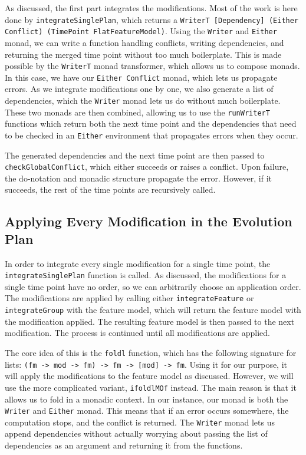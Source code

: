 \documentclass[a4paper,english]{ifimaster}
\begin{document}
As discussed, the first part integrates the modifications. Most of the work is here done by \texttt{integrate\-Single\-Plan}, which returns a \texttt{WriterT [Dependency] (Either Conflict) (TimePoint FlatFeatureModel)}. Using the \texttt{Writer} and \texttt{Either} monad, we can write a function handling conflicts, writing dependencies, and returning the merged time point without too much boilerplate. This is made possible by the \texttt{WriterT} monad transformer, which allows us to compose monads. In this case, we have our \texttt{Either Conflict} monad, which lets us propagate errors. As we integrate modifications one by one, we also generate a list of dependencies, which the \texttt{Writer} monad lets us do without much boilerplate. These two monads are then combined, allowing us to use the \texttt{runWriterT} functions which return both the next time point and the dependencies that need to be checked in an \texttt{Either} environment that propagates errors when they occur.

The generated dependencies and the next time point are then passed to \texttt{check\-Global\-Conflict}, which either succeeds or raises a conflict. Upon failure, the do-notation and monadic structure propagate the error. However, if it succeeds, the rest of the time points are recursively called.

\subsection{Applying Every Modification in the Evolution Plan}%
\label{sub:applying_modifications}

In order to integrate every single modification for a single time point, the \texttt{integrate\-Single\-Plan} function is called. As discussed, the modifications for a single time point have no order, so we can arbitrarily choose an application order. The modifications are applied by calling either \texttt{integrate\-Feature} or \texttt{integrate\-Group} with the feature model, which will return the feature model with the modification applied. The resulting feature model is then passed to the next modification. The process is continued until all modifications are applied.

The core idea of this is the \texttt{foldl} function, which has the following signature for lists: \texttt{(fm -> mod -> fm) -> fm -> [mod] -> fm}. Using it for our purpose, it will apply the modifications to the feature model as discussed. However, we will use the more complicated variant, \texttt{ifoldlMOf} instead. The main reason is that it allows us to fold in a monadic context. In our instance, our monad is both the \texttt{Writer} and \texttt{Either} monad. This means that if an error occurs somewhere, the computation stops, and the conflict is returned. The \texttt{Writer} monad lets us append dependencies without actually worrying about passing the list of dependencies as an argument and returning it from the functions.
\end{document}
